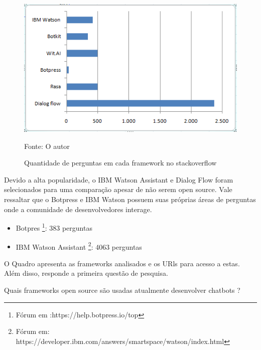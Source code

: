 \begin{figure}[H]
  \caption{Quantidade de perguntas em cada framework no stackoverflow}

  \centering
  \includegraphics[scale=1]{Imagens/frameworks-stack.png} 

  \label{fig:frameworks}
  Fonte: O autor
\end{figure}

Devido a alta popularidade, o IBM Watson Assistant e Dialog Flow foram selecionados para uma comparação apesar de não serem open source. Vale ressaltar que o Botpress e IBM Watson possuem suas próprias áreas de perguntas onde a comunidade de desenvolvedores interage. 


\begin{itemize}
    \item Botpres \footnote{Fórum em :https://help.botpress.io/top}: 383 perguntas
    \item IBM Watson Assistant \footnote{Fórum em: https://developer.ibm.com/answers/smartspace/watson/index.html}: 4063 perguntas 
\end{itemize}



O Quadro apresenta as frameworks analisados e os URls para acesso a estas. Além disso, responde a primeira questão de pesquisa.

Quais frameworks open source são usadas atualmente desenvolver chatbots ?


